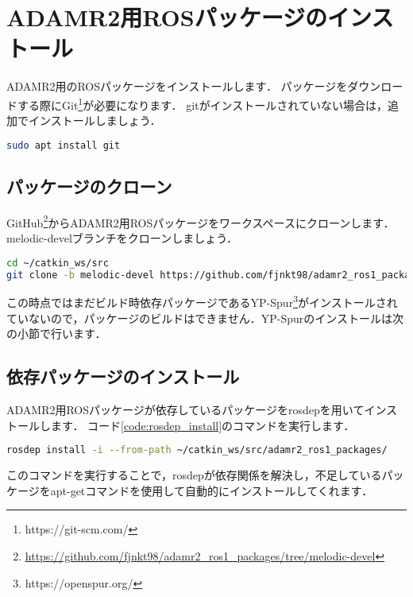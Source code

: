 \documentclass[{../../master}]{subfiles}
\begin{document}
\section{ADAMR2用ROSパッケージのインストール}

ADAMR2用のROSパッケージをインストールします．
パッケージをダウンロードする際にGit\footnote{https://git-scm.com/}が必要になります．
\textsf{git}がインストールされていない場合は，追加でインストールしましょう．

\begin{lstlisting}[language=sh, caption=Gitのインストール]
sudo apt install git
\end{lstlisting}

\subsection{パッケージのクローン}

GitHub\footnote{\url{https://github.com/fjnkt98/adamr2_ros1_packages/tree/melodic-devel}}からADAMR2用ROSパッケージをワークスペースにクローンします．
\textsf{melodic-devel}ブランチをクローンしましょう．

\begin{lstlisting}[language=sh, caption=パッケージのクローニング]
cd ~/catkin_ws/src
git clone -b melodic-devel https://github.com/fjnkt98/adamr2_ros1_packages.git
\end{lstlisting}

この時点ではまだビルド時依存パッケージである\textsf{YP-Spur}\footnote{https://openspur.org/}がインストールされていないので，パッケージのビルドはできません．\textsf{YP-Spur}のインストールは次の小節で行います．

\subsection{依存パッケージのインストール}

ADAMR2用ROSパッケージが依存しているパッケージを\textsf{rosdep}を用いてインストールします．
コード\ref{code:rosdep_install}のコマンドを実行します．

\begin{lstlisting}[language=sh, caption=依存パッケージのインストール, label=code:rosdep_install]
rosdep install -i --from-path ~/catkin_ws/src/adamr2_ros1_packages/
\end{lstlisting}

このコマンドを実行することで，\textsf{rosdep}が依存関係を解決し，不足しているパッケージを\textsf{apt-get}コマンドを使用して自動的にインストールしてくれます．
\end{document}
